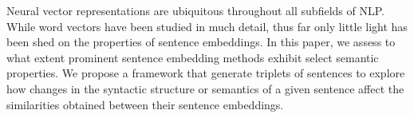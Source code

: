 Neural vector representations are ubiquitous throughout all subfields of NLP. While word vectors have been studied in much detail, thus far only little light has been shed on the properties of sentence embeddings. In this paper, we assess to what extent prominent sentence embedding methods exhibit select semantic properties. We propose a framework that generate triplets of sentences to explore how changes in the syntactic structure or semantics of a given sentence affect the similarities obtained between their sentence embeddings.
